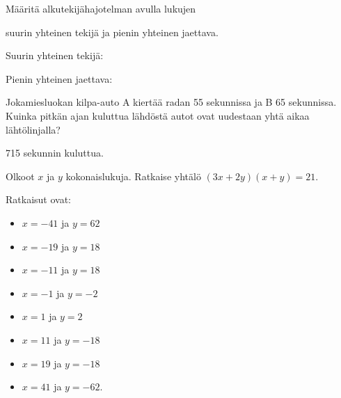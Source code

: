 \begin{tehtava}
    Määritä alkutekijähajotelman avulla lukujen
    \begin{alakohdat}
    \end{alakohdat}
    suurin yhteinen tekijä ja pienin yhteinen jaettava.
    
    \begin{vastaus}
        Suurin yhteinen tekijä:
        \begin{alakohdatrivi}
        \end{alakohdatrivi}
        Pienin yhteinen jaettava:
        \begin{alakohdatrivi}
        \end{alakohdatrivi}
    \end{vastaus}
    
\end{tehtava}

\begin{tehtava}
    Jokamiesluokan kilpa-auto A kiertää radan 55 sekunnissa ja B 65 sekunnissa. Kuinka pitkän ajan kuluttua lähdöstä autot ovat uudestaan yhtä aikaa lähtölinjalla?
    
    \begin{vastaus}
        715 sekunnin kuluttua.
    \end{vastaus}
\end{tehtava}

\begin{tehtava}
    Olkoot $x$ ja $y$ kokonaislukuja. Ratkaise yhtälö $(3x+2y)(x+y)=21$.
    
    \begin{vastaus}
        Ratkaisut ovat:
        \begin{itemize}
            \item $x = -41$ ja $y = 62$
            \item $x = -19$ ja $y = 18$
            \item $x = -11$ ja $y = 18$
            \item $x = -1$ ja $y = -2$
            \item $x = 1$ ja $y = 2$
            \item $x = 11$ ja $y = -18$
            \item $x = 19$ ja $y = -18$
            \item $x = 41$ ja $y = -62$.
        \end{itemize}
    \end{vastaus}
    
\end{tehtava}

